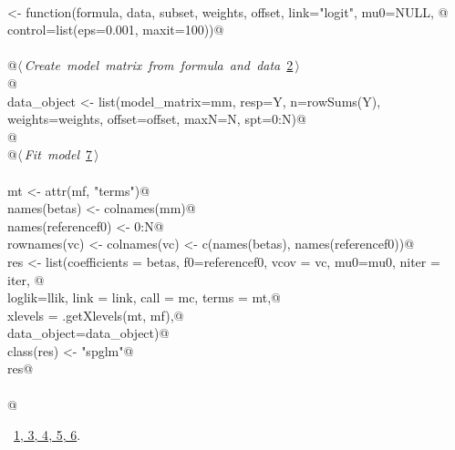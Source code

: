 \documentclass[reqno]{amsart}
\renewcommand{\NWlink}[2]{\hyperlink{#1}{#2}}
\begin{document}
\begin{flushleft}
\begin{list}{}{}
\mbox{}\verb@@\\
\mbox{}\verb@spglm <- function(formula, data, subset, weights, offset, link="logit", mu0=NULL, @\\
\mbox{}\verb@                  control=list(eps=0.001, maxit=100)){@\\
\mbox{}\verb@@\\
\mbox{}\verb@    @\hbox{$\langle\,${\itshape Create model matrix from formula and data}\nobreak\ {\footnotesize \NWlink{nuweb2}{2}}$\,\rangle$}\verb@@\\
\mbox{}\verb@    @\\
\mbox{}\verb@    data_object <- list(model_matrix=mm, resp=Y, n=rowSums(Y), weights=weights, offset=offset, maxN=N, spt=0:N)@\\
\mbox{}\verb@    @\\
\mbox{}\verb@    @\hbox{$\langle\,${\itshape Fit model}\nobreak\ {\footnotesize \NWlink{nuweb7}{7}}$\,\rangle$}\verb@@\\
\mbox{}\verb@@\\
\mbox{}\verb@    mt <- attr(mf, "terms")@\\
\mbox{}\verb@    names(betas) <- colnames(mm)@\\
\mbox{}\verb@    names(referencef0) <- 0:N@\\
\mbox{}\verb@    rownames(vc) <- colnames(vc) <- c(names(betas), names(referencef0))@\\
\mbox{}\verb@    res <- list(coefficients = betas, f0=referencef0, vcov = vc, mu0=mu0, niter = iter, @\\
\mbox{}\verb@                loglik=llik, link = link, call = mc, terms = mt,@\\
\mbox{}\verb@                xlevels = .getXlevels(mt, mf),@\\
\mbox{}\verb@                data_object=data_object)@\\
\mbox{}\verb@    class(res) <- "spglm"@\\
\mbox{}\verb@    res@\\
\mbox{}\verb@@\\
\mbox{}\verb@}@\\
\mbox{}\verb@@{\NWsep}
\end{list}
\vspace{-1.5ex}
\footnotesize
\begin{list}{}{\setlength{\itemsep}{-\parsep}\setlength{\itemindent}{-\leftmargin}}
\item \NWtxtFileDefBy\ \NWlink{nuweb1}{1}\NWlink{nuweb3}{, 3}\NWlink{nuweb4}{, 4}\NWlink{nuweb5}{, 5}\NWlink{nuweb6}{, 6}.

\item{}
\end{list}
\vspace{4ex}
\end{flushleft}
\end{document}
